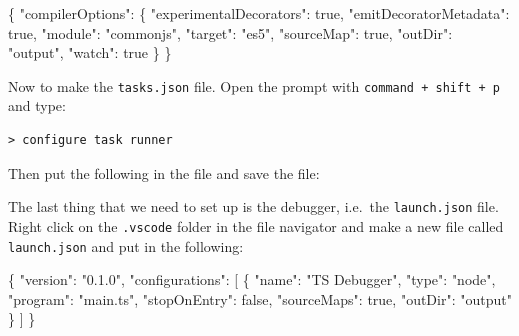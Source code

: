 \documentclass[12pt,]{article}
\newenvironment{Shaded}{}{}
\newcommand{\KeywordTok}[1]{\textcolor[rgb]{0.00,0.00,1.00}{{#1}}}
\newcommand{\StringTok}[1]{\textcolor[rgb]{0.00,0.50,0.50}{{#1}}}
\newcommand{\OperatorTok}[1]{{#1}}
\newcommand{\NormalTok}[1]{{#1}}
\begin{document}
\begin{Shaded}
\begin{Highlighting}[numbers=left,,]
\OperatorTok{\{}
  \StringTok{"compilerOptions"}\OperatorTok{:} \OperatorTok{\{}
    \StringTok{"experimentalDecorators"}\OperatorTok{:} \KeywordTok{true}\OperatorTok{,}
    \StringTok{"emitDecoratorMetadata"}\OperatorTok{:} \KeywordTok{true}\OperatorTok{,}
    \StringTok{"module"}\OperatorTok{:} \StringTok{"commonjs"}\OperatorTok{,}
    \StringTok{"target"}\OperatorTok{:} \StringTok{"es5"}\OperatorTok{,}
    \StringTok{"sourceMap"}\OperatorTok{:} \KeywordTok{true}\OperatorTok{,}
    \StringTok{"outDir"}\OperatorTok{:} \StringTok{"output"}\OperatorTok{,}
    \StringTok{"watch"}\OperatorTok{:} \KeywordTok{true}
  \OperatorTok{\}}
\OperatorTok{\}}
\end{Highlighting}
\end{Shaded}

Now to make the \texttt{tasks.json} file. Open the prompt with
\texttt{command\ +\ shift\ +\ p} and type:

\begin{verbatim}
> configure task runner
\end{verbatim}

Then put the following in the file and save the file:

\begin{Shaded}
\end{Shaded}

The last thing that we need to set up is the debugger, i.e.~the
\texttt{launch.json} file. Right click on the \texttt{.vscode} folder in
the file navigator and make a new file called \texttt{launch.json} and
put in the following:

\begin{Shaded}
\begin{Highlighting}[numbers=left,,]
\OperatorTok{\{}
  \StringTok{"version"}\OperatorTok{:} \StringTok{"0.1.0"}\OperatorTok{,}
  \StringTok{"configurations"}\OperatorTok{:} \NormalTok{[}
    \OperatorTok{\{}
      \StringTok{"name"}\OperatorTok{:} \StringTok{"TS Debugger"}\OperatorTok{,}
      \StringTok{"type"}\OperatorTok{:} \StringTok{"node"}\OperatorTok{,}
      \StringTok{"program"}\OperatorTok{:} \StringTok{"main.ts"}\OperatorTok{,}
      \StringTok{"stopOnEntry"}\OperatorTok{:} \KeywordTok{false}\OperatorTok{,}
      \StringTok{"sourceMaps"}\OperatorTok{:} \KeywordTok{true}\OperatorTok{,}
      \StringTok{"outDir"}\OperatorTok{:} \StringTok{"output"}
    \OperatorTok{\}}
  \NormalTok{]}
\OperatorTok{\}}
\end{Highlighting}
\end{Shaded}
\end{document}
